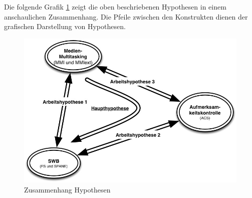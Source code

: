 \par
Die folgende Grafik \ref{pic.einleitung.hypothesen} zeigt die oben beschriebenen Hypothesen in einem anschaulichen Zusammenhang. Die Pfeile zwischen den Konstrukten dienen der grafischen Darstellung von Hypothesen.
\begin{figure}[h]
    \centering
    \includegraphics[scale=0.6]{images/grafiken/Hypothesen_Grafisch_v1.jpg}
     \caption{Zusammenhang Hypothesen}
     \label{pic.einleitung.hypothesen}
\end{figure}





